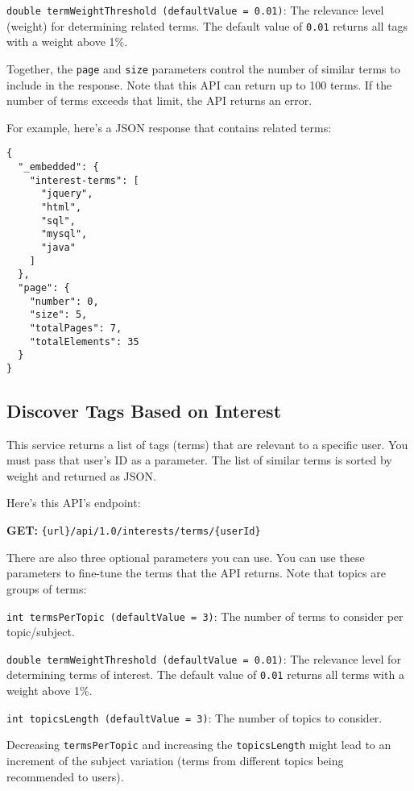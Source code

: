 \texttt{double\ termWeightThreshold\ (defaultValue\ =\ 0.01)}: The
relevance level (weight) for determining related terms. The default
value of \texttt{0.01} returns all tags with a weight above 1\%.

Together, the \texttt{page} and \texttt{size} parameters control the
number of similar terms to include in the response. Note that this API
can return up to 100 terms. If the number of terms exceeds that limit,
the API returns an error.

For example, here's a JSON response that contains related terms:

\begin{verbatim}
{
  "_embedded": {
    "interest-terms": [
      "jquery",
      "html",
      "sql",
      "mysql",
      "java"
    ]
  },
  "page": {
    "number": 0,
    "size": 5,
    "totalPages": 7,
    "totalElements": 35
  }
}
\end{verbatim}

\subsection{Discover Tags Based on
Interest}\label{discover-tags-based-on-interest}

This service returns a list of tags (terms) that are relevant to a
specific user. You must pass that user's ID as a parameter. The list of
similar terms is sorted by weight and returned as JSON.

Here's this API's endpoint:

\textbf{GET:} \texttt{\{url\}/api/1.0/interests/terms/\{userId\}}

There are also three optional parameters you can use. You can use these
parameters to fine-tune the terms that the API returns. Note that topics
are groups of terms:

\texttt{int\ termsPerTopic\ (defaultValue\ =\ 3)}: The number of terms
to consider per topic/subject.

\texttt{double\ termWeightThreshold\ (defaultValue\ =\ 0.01)}: The
relevance level for determining terms of interest. The default value of
\texttt{0.01} returns all terms with a weight above 1\%.

\texttt{int\ topicsLength\ (defaultValue\ =\ 3)}: The number of topics
to consider.

Decreasing \texttt{termsPerTopic} and increasing the
\texttt{topicsLength} might lead to an increment of the subject
variation (terms from different topics being recommended to users).

